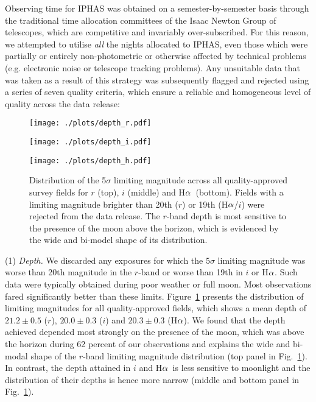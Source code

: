 \documentclass[useAMS,usenatbib]{mn2e}
\def\ha{\mbox{H$\rm \alpha$}}
\begin{document}
Observing time for IPHAS was obtained
on a semester-by-semester basis
through the traditional time allocation committees 
of the Isaac Newton Group of telescopes,
which are competitive and invariably over-subscribed.
For this reason, we attempted to utilise 
\emph{all} the nights allocated to IPHAS,
even those which were partially or entirely non-photometric
or otherwise affected by technical problems 
(e.g. electronic noise or telescope tracking problems).
Any unsuitable data that was taken as a result
of this strategy was subsequently flagged and rejected
using a series of seven quality criteria,
which ensure a reliable and homogeneous level of quality
across the data release:

\begin{figure}
    \begin{minipage}[b]{\linewidth}
        \texttt{[image: ./plots/depth\_r.pdf]} 
    \end{minipage}
    \begin{minipage}[b]{\linewidth}
        \texttt{[image: ./plots/depth\_i.pdf]} 
    \end{minipage}
    \begin{minipage}[b]{\linewidth}
        \texttt{[image: ./plots/depth\_h.pdf]} 
    \end{minipage}
    \caption{Distribution of the 5$\sigma$ limiting magnitude
             across all quality-approved survey fields
             for $r$ (top), $i$ (middle) and \ha\ (bottom).
             Fields with a limiting magnitude brighter than
             20th ($r$) or 19th (\ha/$i$) were rejected
             from the data release.
             The $r$-band depth is most sensitive 
             to the presence of the moon above the horizon, 
             which is evidenced by the wide and bi-model shape
             of its distribution.}
    \label{fig:depth}
\end{figure}

(1) \emph{Depth.} 
We discarded any exposures for which the $5\sigma$ limiting magnitude 
was worse than 20th magnitude in the $r$-band
or worse than 19th in $i$ or \ha. 
Such data were typically obtained during poor weather or full moon.
Most observations fared significantly better than these limits.
Figure~\ref{fig:depth} presents the distribution of limiting magnitudes
for all quality-approved fields,
which shows a mean depth of 
$21.2\pm0.5$ ($r$), $20.0\pm0.3$ ($i$) and $20.3\pm0.3$ (\ha).
We found that the depth achieved depended 
most strongly on the presence of the moon,
which was above the horizon during 62 percent 
of our observations and explains the wide and bi-modal shape
of the $r$-band limiting magnitude distribution 
(top panel in Fig.~\ref{fig:depth}).
In contrast, the depth attained in $i$ and \ha\ 
is less sensitive to moonlight
and the distribution of their depths
is hence more narrow
(middle and bottom panel in Fig.~\ref{fig:depth}).
\end{document}
